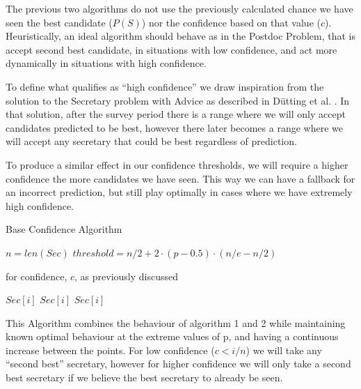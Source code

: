 \documentclass[a4paper,11pt]{article}
\begin{document}
The previous two algorithms do not use the previously calculated chance we have seen the best candidate ($P(S)$) nor the confidence based on that value ($c$). Heuristically, an ideal algorithm should behave as in the Postdoc Problem, that is accept second best candidate, in situations with low confidence, and act more dynamically in situations with high confidence.

To define what qualifies as ``high confidence'' we draw inspiration from the solution to the Secretary problem with Advice as described in Dütting et al. \cite{dütting2020secretariesadvice}. In that solution, after the survey period there is a range where we will only accept candidates predicted to be best, however there later becomes a range where we will accept any secretary that could be best regardless of prediction. 

To produce a similar effect in our confidence thresholds, we will require a higher confidence the more candidates we have seen. This way we can have a fallback for an incorrect prediction, but still play optimally in cases where we have extremely high confidence.

\begin{algorithm}[H]
\caption{Base Confidence Algorithm}
\begin{algorithmic}[1]

\State $n = len(Sec)$
\State $threshold = n/2 + 2 \cdot (p-0.5) \cdot (n/e - n/2)$

\State for confidence, $c$, as previously discussed

                \State \Return $Sec[i]$
            \EndIf
            \State \Return $Sec[i]$
        \EndIf
    \EndFor
    \State \Return $Sec[i]$
\EndProcedure
\end{algorithmic}
\end{algorithm}
 
This Algorithm combines the behaviour of algorithm 1 and 2 while maintaining known optimal behaviour at the extreme values of p, and having a continuous increase between the points. For low confidence ($c < i/n$) we will take any ``second best'' secretary, however for higher confidence we will only take a second best secretary if we believe the best secretary to already be seen.

\label{assumption1}
\end{document}

